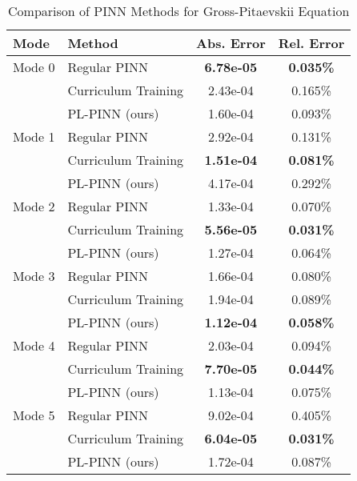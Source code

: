 \begin{table}[htbp]
\centering
\caption{Comparison of PINN Methods for Gross-Pitaevskii Equation}
\label{tab:pinn_comparison}
\begin{tabular}{llcc}
\toprule
Mode & Method & Abs. Error & Rel. Error \\
\midrule
Mode 0 & Regular PINN & \textbf{6.78e-05} & \textbf{0.035\%} \\
 & Curriculum Training & 2.43e-04 & 0.165\% \\
 & PL-PINN (ours) & 1.60e-04 & 0.093\% \\
\midrule
Mode 1 & Regular PINN & 2.92e-04 & 0.131\% \\
 & Curriculum Training & \textbf{1.51e-04} & \textbf{0.081\%} \\
 & PL-PINN (ours) & 4.17e-04 & 0.292\% \\
\midrule
Mode 2 & Regular PINN & 1.33e-04 & 0.070\% \\
 & Curriculum Training & \textbf{5.56e-05} & \textbf{0.031\%} \\
 & PL-PINN (ours) & 1.27e-04 & 0.064\% \\
\midrule
Mode 3 & Regular PINN & 1.66e-04 & 0.080\% \\
 & Curriculum Training & 1.94e-04 & 0.089\% \\
 & PL-PINN (ours) & \textbf{1.12e-04} & \textbf{0.058\%} \\
\midrule
Mode 4 & Regular PINN & 2.03e-04 & 0.094\% \\
 & Curriculum Training & \textbf{7.70e-05} & \textbf{0.044\%} \\
 & PL-PINN (ours) & 1.13e-04 & 0.075\% \\
\midrule
Mode 5 & Regular PINN & 9.02e-04 & 0.405\% \\
 & Curriculum Training & \textbf{6.04e-05} & \textbf{0.031\%} \\
 & PL-PINN (ours) & 1.72e-04 & 0.087\% \\
\bottomrule
\end{tabular}
\end{table}
